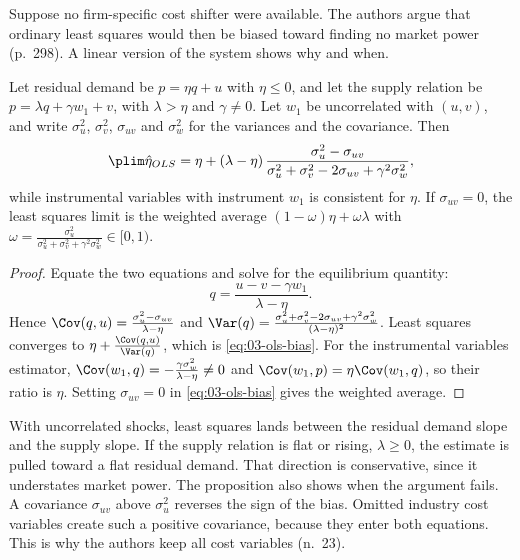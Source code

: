  Suppose no firm-specific cost shifter were available. The
authors argue that ordinary least squares would then be biased toward finding no market power (p.~298). A
linear version of the system shows why and when.

\begin{proposition}\label{prop:03-ols-residual}
Let residual demand be $p = \eta q + u$ with $\eta \le 0$, and let the supply relation be $p = \lambda q +
\gamma w_1 + v$, with $\lambda > \eta$ and $\gamma \neq 0$. Let $w_1$ be uncorrelated with $(u, v)$, and write
$\sigma_u^2$, $\sigma_v^2$, $\sigma_{uv}$ and $\sigma_w^2$ for the variances and the covariance. Then
\begin{equation}\label{eq:03-ols-bias}
  \plim \hat\eta_{OLS} = \eta + (\lambda - \eta)\,
  \frac{\sigma_u^2 - \sigma_{uv}}{\sigma_u^2 + \sigma_v^2 - 2\sigma_{uv} + \gamma^2\sigma_w^2},
\end{equation}
while instrumental variables with instrument $w_1$ is consistent for $\eta$. If $\sigma_{uv} = 0$, the
least squares limit is the weighted average $(1 - \omega)\eta + \omega\lambda$ with $\omega =
\frac{\sigma_u^2}{\sigma_u^2 + \sigma_v^2 + \gamma^2\sigma_w^2} \in [0, 1)$.
\end{proposition}

\begin{proof}
Equate the two equations and solve for the equilibrium quantity:
\begin{equation*}
  q = \frac{u - v - \gamma w_1}{\lambda - \eta}.
\end{equation*}
Hence $\Cov(q, u) = \frac{\sigma_u^2 - \sigma_{uv}}{\lambda - \eta}$ and $\Var(q) = \frac{\sigma_u^2 +
\sigma_v^2 - 2\sigma_{uv} + \gamma^2\sigma_w^2}{(\lambda - \eta)^2}$. Least squares converges to $\eta +
\frac{\Cov(q, u)}{\Var(q)}$, which is \eqref{eq:03-ols-bias}. For the instrumental variables estimator,
$\Cov(w_1, q) = -\frac{\gamma\sigma_w^2}{\lambda - \eta} \neq 0$ and $\Cov(w_1, p) = \eta\Cov(w_1, q)$, so
their ratio is $\eta$. Setting $\sigma_{uv} = 0$ in \eqref{eq:03-ols-bias} gives the weighted average.
\end{proof}

With uncorrelated shocks, least squares lands between the residual demand slope and the supply slope. If the
supply relation is flat or rising, $\lambda \ge 0$, the estimate is pulled toward a flat residual demand. That
direction is conservative, since it understates market power. The proposition also shows when the argument
fails. A covariance $\sigma_{uv}$ above $\sigma_u^2$ reverses the sign of the bias. Omitted industry cost
variables create such a positive covariance, because they enter both equations. This is why the authors keep
all cost variables (n.~23).

